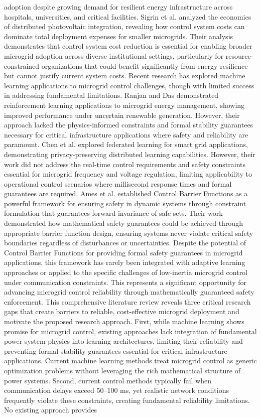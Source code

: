 \documentclass[12pt]{article}
\begin{document}
adoption despite growing demand for resilient energy infrastructure across hospitals, universities, and critical facilities.
Sigrin et al. \cite{sigrin2016} analyzed the economics of distributed photovoltaic integration, revealing how control system costs can dominate total deployment expenses for smaller microgrids. Their analysis demonstrates that control system cost reduction is essential for enabling broader microgrid adoption across diverse institutional settings, particularly for resource-constrained organizations that could benefit significantly from energy resilience but cannot justify current system costs. Recent research has explored machine learning applications to microgrid control challenges, though with limited success in addressing fundamental limitations. Ranjan and Das \cite{ranjan2021} demonstrated reinforcement learning applications to microgrid energy management, showing improved performance under uncertain renewable generation. However, their approach lacked the physics-informed constraints and formal stability guarantees necessary for critical infrastructure applications where safety and reliability are paramount. Chen et al. \cite{chen2021} explored federated learning for smart grid applications, demonstrating privacy-preserving distributed learning capabilities. However, their work did not address the real-time control requirements and safety constraints essential for microgrid frequency and voltage regulation, limiting applicability to operational control scenarios where millisecond response times and formal guarantees are required. Ames et al. \cite{ames2019} established Control Barrier Functions as a powerful framework for ensuring safety in dynamic systems through constraint formulation that guarantees forward invariance of safe sets. Their work demonstrated how mathematical safety guarantees could be achieved through appropriate barrier function design, ensuring systems never violate critical safety boundaries regardless of disturbances or uncertainties. Despite the potential of Control Barrier Functions for providing formal safety guarantees in microgrid applications, this framework has rarely been integrated with adaptive learning approaches or applied to the specific challenges of low-inertia microgrid control under communication constraints. This represents a significant opportunity for advancing microgrid control reliability through mathematically guaranteed safety enforcement. This comprehensive literature review reveals three critical research gaps that create barriers to reliable, cost-effective microgrid deployment and motivate the proposed research approach. First, while machine learning shows promise for microgrid control, existing approaches lack integration of fundamental power system physics into learning architectures, limiting their reliability and preventing formal stability guarantees essential for critical infrastructure applications. Current machine learning methods treat microgrid control as generic optimization problems without leveraging the rich mathematical structure of power systems. Second, current control methods typically fail when communication delays exceed 50--100 ms, yet realistic network conditions frequently violate these constraints, creating fundamental reliability limitations. No existing approach provides 
\end{document}
